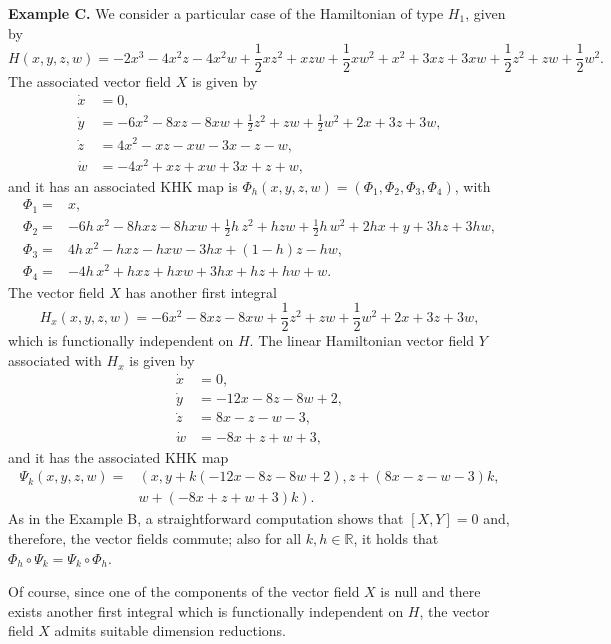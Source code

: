 \documentclass[11pt]{article}
\begin{document}
\medskip

\noindent \textbf{Example C.} We consider a particular case of the Hamiltonian of type $H_1$, given by
$$
H(x,y,z,w)=-2 x^{3}-4 x^{2} z -4 x^{2} w +\frac{1}{2} x z^{2}+x z w +\frac{1}{2} x w^{2}+x^{2}+3 x z +3 x w +\frac{1}{2} z^{2}+z w +\frac{1}{2} w^{2}.
$$
The associated vector field $X$ is given by
\begin{align*}
\dot{x}&=0,\\
\dot{y}&=-6 x^{2}-8 x z -8 x w +\frac{1}{2} z^{2}+z w +\frac{1}{2} w^{2}+2 x +3 z +3 w,\\
\dot{z}&=4 x^{2}-x z -x w -3 x -z -w,\\
\dot{w}&=-4 x^{2}+x z +x w +3 x +z +w,
\end{align*}
and it has an associated KHK map is $\Phi_{h}(x,y,z,w)=(\Phi_1,\Phi_2,\Phi_3,\Phi_4)$, with
\begin{align*}
\Phi_1=&x,\\
\Phi_2=&-6 h \,x^{2}-8 h x z -8 h x w +\frac{1}{2} h \,z^{2}+h z w +\frac{1}{2} h \,w^{2}+2 h x +y +3 h z +3 h w,
\\
\Phi_3=&4 h \,x^{2}-h x z -h x w -3 h x +(1-h) z -h w,
\\
\Phi_4=&-4 h \,x^{2}+h x z +h x w +3 h x +h z +h w +w.
\end{align*}
The vector field $X$ has another first integral
$$
H_{x}(x,y,z,w)=-6 x^{2}-8 x z -8 x w +\frac{1}{2} z^{2}+z w +\frac{1}{2} w^{2}+2 x +3 z +3 w,
$$
which is functionally independent on $H$. The linear Hamiltonian vector field $Y$ associated with $H_{x}$ is given by
\begin{align*}
\dot{x}&=0,\\
\dot{y}&=-12 x -8 z -8 w +2,\\
\dot{z}&=8 x -z -w -3,\\
\dot{w}&=-8 x +z +w +3,
\end{align*}
and it has the associated KHK map
\begin{align*}
\Psi_k(x,y,z,w)=&\left(x,y+k \left(-12 x -8 z -8 w +2\right), z+\left(8 x -z -w -3\right) k ,\right.\\
&\left.w+\left(-8 x +z +w +3\right) k\right).
\end{align*}
As in the Example B, a straightforward computation shows that $[X,Y]=0$ and, therefore, the vector fields commute;  also for all $k,h\in\mathbb{R}$, it holds that $\Phi_h\circ \Psi_k= \Psi_k\circ\Phi_h$.

Of course, since one of the components of the vector field $X$ is null and there exists another first integral which is functionally independent on $H$, the vector field $X$ admits suitable dimension reductions.
\end{document}
